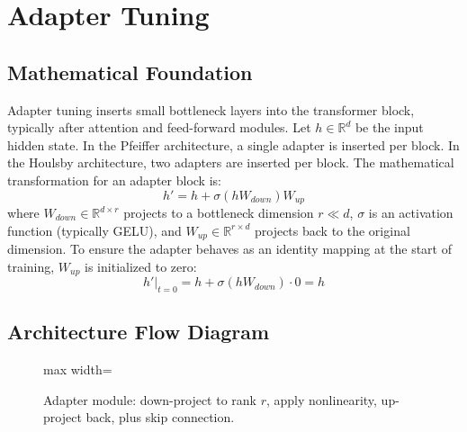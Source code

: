 \newpage
\section{Adapter Tuning}

\subsection{Mathematical Foundation}
Adapter tuning inserts small bottleneck layers into the transformer block, typically after attention and feed-forward modules. Let $h \in \mathbb{R}^d$ be the input hidden state.
In the Pfeiffer architecture, a single adapter is inserted per block. In the Houlsby architecture, two adapters are inserted per block. The mathematical transformation for an adapter block is:
\begin{equation}
  h' = h + \sigma(h W_{down}) W_{up}
\end{equation}
where $W_{down} \in \mathbb{R}^{d \times r}$ projects to a bottleneck dimension $r \ll d$, $\sigma$ is an activation function (typically GELU), and $W_{up} \in \mathbb{R}^{r \times d}$ projects back to the original dimension.
To ensure the adapter behaves as an identity mapping at the start of training, $W_{up}$ is initialized to zero:
\begin{equation}
  h' \bigr|_{t=0} = h + \sigma(h W_{down}) \cdot 0 = h
\end{equation}

\subsection{Architecture Flow Diagram}

\begin{figure}[h]
\centering
\begin{adjustbox}{max width=\linewidth}
\end{adjustbox}
\caption{Adapter module: down-project to rank $r$, apply nonlinearity, up-project back, plus skip connection.}
\end{figure}


